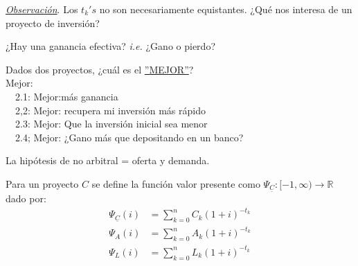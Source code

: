 \begin{center}

\end{center}

\textit{\underline{Observación}}. Los $t_k's$ no son necesariamente equistantes. ¿Qué nos interesa de un proyecto de inversión?

 ¿Hay una ganancia efectiva? \textit{i.e.} ¿Gano o pierdo?

 Dados dos proyectos, ¿cuál es el \underline{''MEJOR''}?\\

Mejor:\\
$\quad$2.1: Mejor:más ganancia\\
$\quad$2,2: Mejor: recupera mi inversión más rápido\\
$\quad$2.3: Mejor: Que la inversión inicial sea menor\\
$\quad$2.4; Mejor: ¿Gano más que depositando en un banco?

La hipótesis de no arbitral = oferta y demanda.

\begin{definition}
Para un proyecto \underline{$C$} se define la función valor presente como $\Psi_{\underline{C}}: [-1,\infty)\to\mathbb{R}$ dado por:
\begin{align*}
    \Psi_{\underline{C}}(i) &= \sum_{k=0}^n C_k(1+i)^{-t_k}\\
    \Psi_{A}(i) &= \sum_{k=0}^n A_k(1+i)^{-t_k}\\
    \Psi_{L}(i) &= \sum_{k=0}^n L_k(1+i)^{-t_k}
\end{align*}
\end{definition}

